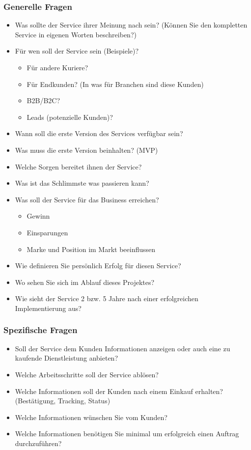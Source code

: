 \subsubsection{Generelle Fragen}
\begin{itemize}
  \item Was sollte der Service ihrer Meinung nach sein? (Können Sie den kompletten Service in eigenen Worten beschreiben?)
  \item Für wen soll der Service sein (Beispiele)?
  \begin{itemize}
    \item Für andere Kuriere?
    \item Für Endkunden? (In was für Branchen sind diese Kunden)
    \item B2B/B2C?
    \item Leads (potenzielle Kunden)?
  \end{itemize}
  \item Wann soll die erste Version des Services verfügbar sein?
  \item Was muss die erste Version beinhalten? (MVP)
  \item Welche Sorgen bereitet ihnen der Service?
  \item Was ist das Schlimmste was passieren kann?
  \item Was soll der Service für das Business erreichen?
  \begin{itemize}
    \item Gewinn
    \item Einsparungen
    \item Marke und Position im Markt beeinflussen
  \end{itemize}
  \item Wie definieren Sie persönlich Erfolg für diesen Service?
  \item Wo sehen Sie sich im Ablauf dieses Projektes?
  \item Wie sieht der Service 2 bzw. 5 Jahre nach einer erfolgreichen Implementierung aus?
\end{itemize}

\subsubsection{Spezifische Fragen}
\begin{itemize}
  \item Soll der Service dem Kunden Informationen anzeigen oder auch eine zu kaufende Dienstleistung anbieten?
  \item Welche Arbeitsschritte soll der Service ablösen?
  \item Welche Informationen soll der Kunden nach einem Einkauf erhalten? (Bestätigung, Tracking, Status)
  \item Welche Informationen wünschen Sie vom Kunden?
  \item Welche Informationen benötigen Sie minimal um erfolgreich einen Auftrag durchzuführen?
\end{itemize}

